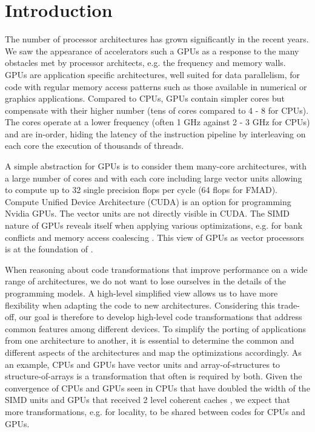 \section{Introduction}
The number of processor architectures has grown significantly in the recent
years. We saw the appearance of accelerators such a GPUs as a response to the
many obstacles met by processor architects, e.g. the frequency and memory walls.
GPUs are application specific architectures, well suited for data parallelism,
for code with regular memory access patterns such as those available in
numerical or graphics applications. Compared to CPUs, GPUs contain simpler cores
but compensate with their higher number (tens of cores compared to 4 - 8 for
CPUs). The cores operate at a lower frequency (often 1 GHz against 2 - 3 GHz for
CPUs) and are in-order, hiding the latency of the instruction pipeline by
interleaving on each core the execution of thousands of threads.

A simple abstraction for GPUs is to consider them many-core architectures, with
a large number of cores and with each core including large vector units
allowing to compute up to 32 single precision flops per cycle (64 flops for
FMAD). Compute Unified Device Architecture (CUDA) is an option for programming
Nvidia GPUs. The vector units are not directly visible in CUDA. The SIMD nature
of GPUs reveals itself when applying various optimizations, e.g. for bank
conflicts and memory access coalescing \cite{cuda}. This view of GPUs as vector
processors is at the foundation of \cite{Volkov:2008:BGT:1413370.1413402}.

When reasoning about code transformations that improve performance on a wide
range of architectures, we do not want to lose ourselves in the details of the
programming models. A high-level simplified view allows us to have more
flexibility when adapting the code to new architectures. Considering this
trade-off, our goal is therefore to develop high-level code transformations that
address common features among different devices. 
To simplify the porting of 
applications from one architecture to another, it is essential to determine the
common and different aspects of the architectures and map the optimizations
accordingly. As an example, CPUs and GPUs have vector units and
array-of-structures to structure-of-arrays is a transformation that often is
required by both. Given the convergence of CPUs and GPUs seen in CPUs that have
doubled the width of the SIMD units and GPUs that received 2 level coherent
caches \cite{fermi}, we expect that more transformations, e.g. for locality, to
be shared between codes for CPUs and GPUs.

